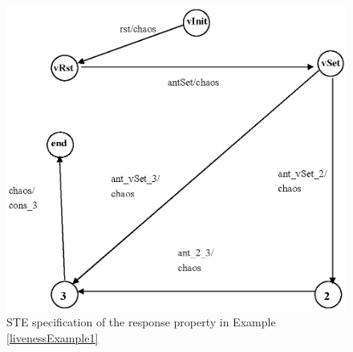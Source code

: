 \documentclass[final]{IEEEtran}
\begin{document}
\begin{figure}[tbph]
\begin{center}
\includegraphics[width=.4\textwidth]{figLiveness1.eps}
\end{center}
\caption{STE specification of the response property in Example
\ref{livenessExample1}} \label{figLiveness1}
\end{figure}
\end{document}
